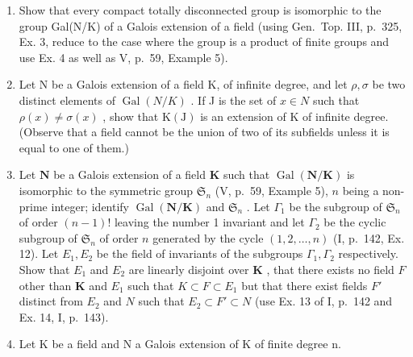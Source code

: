 \begin{enumerate}
\def\labelenumi{\arabic{enumi})}
\setcounter{enumi}{4}
\item
  Show that every compact totally disconnected group is isomorphic to the group Gal(N/K) of a Galois extension of a field (using Gen.~Top. III, p.~325, Ex. 3, reduce to the case where the group is a product of finite groups and use Ex. 4 as well as V, p.~59, Example 5).
\item
  Let N be a Galois extension of a field K, of infinite degree, and let \(\rho, \sigma\) be two distinct elements of \(\operatorname{Gal}(N/K)\) . If J is the set of \(x \in N\) such that \(\rho(x) \neq \sigma(x)\) , show that \(\mathrm{K}(\mathrm{J})\) is an extension of K of infinite degree. (Observe that a field cannot be the union of two of its subfields unless it is equal to one of them.)
\item
  Let \(\mathbf{N}\) be a Galois extension of a field \(\mathbf{K}\) such that \(\operatorname{Gal}(\mathbf{N} / \mathbf{K})\) is isomorphic to the symmetric group \(\mathfrak{S}_n\) (V, p.~59, Example 5), \(n\) being a non-prime integer; identify \(\operatorname{Gal}(\mathbf{N} / \mathbf{K})\) and \(\mathfrak{S}_n\) . Let \(\Gamma_1\) be the subgroup of \(\mathfrak{S}_n\) of order \((n - 1)!\) leaving the number 1 invariant and let \(\Gamma_2\) be the cyclic subgroup of \(\mathfrak{S}_n\) of order \(n\) generated by the cycle \((1, 2, \ldots, n)\) (I, p.~142, Ex. 12). Let \(E_1, E_2\) be the field of invariants of the subgroups \(\Gamma_1, \Gamma_2\) respectively. Show that \(E_1\) and \(E_2\) are linearly disjoint over \(\mathbf{K}\) , that there exists no field \(F\) other than \(\mathbf{K}\) and \(E_1\) such that \(K \subset F \subset E_1\) but that there exist fields \(F'\) distinct from \(E_2\) and \(N\) such that \(E_2 \subset F' \subset N\) (use Ex. 13 of I, p.~142 and Ex. 14, I, p.~143).
\item
  Let K be a field and N a Galois extension of K of finite degree n.
\end{enumerate}

